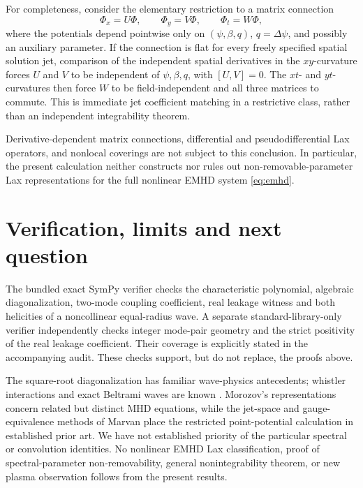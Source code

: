\documentclass[11pt,a4paper]{article}
\begin{document}
For completeness, consider the elementary restriction to a matrix
connection
\[
 \Phi_x=U\Phi,\qquad \Phi_y=V\Phi,\qquad \Phi_t=W\Phi,
\]
where the potentials depend pointwise only on
\((\psi,\beta,q)\), \(q=\Delta\psi\), and possibly an auxiliary
parameter. If the connection is flat for every freely specified
spatial solution jet, comparison of the independent spatial derivatives
in the \(xy\)-curvature forces \(U\) and \(V\) to be independent of
\(\psi,\beta,q\), with \([U,V]=0\). The \(xt\)- and \(yt\)-curvatures
then force \(W\) to be field-independent and all three matrices to
commute. This is immediate jet coefficient matching in a restrictive
class, rather than an independent integrability theorem.

Derivative-dependent matrix connections, differential and
pseudodifferential Lax operators, and nonlocal coverings are not
subject to this conclusion. In particular, the present calculation
neither constructs nor rules out non-removable-parameter Lax
representations for the full nonlinear EMHD system \eqref{eq:emhd}.

\section{Verification, limits and next question}
The bundled exact SymPy verifier checks the characteristic polynomial, algebraic diagonalization, two-mode coupling coefficient, real leakage witness and both helicities of a noncollinear equal-radius wave. A separate standard-library-only verifier independently checks integer mode-pair geometry and the strict positivity of the real leakage coefficient. Their coverage is explicitly stated in the accompanying audit. These checks support, but do not replace, the proofs above.

The square-root diagonalization has familiar wave-physics antecedents; whistler interactions and exact Beltrami waves are known \cite{lyutikov}. Morozov's representations \cite{morozov} concern related but distinct MHD equations, while the jet-space and gauge-equivalence methods of Marvan \cite{marvan1993,marvan2002} place the restricted point-potential calculation in established prior art. We have not established priority of the particular spectral or convolution identities. No nonlinear EMHD Lax classification, proof of spectral-parameter non-removability, general nonintegrability theorem, or new plasma observation follows from the present results.
\end{document}
